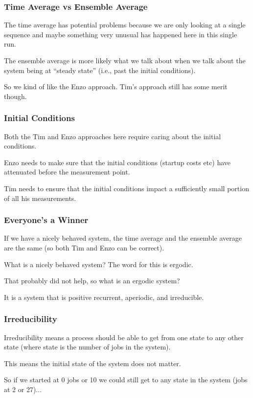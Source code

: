 \begin{frame}
\frametitle{Time Average vs Ensemble Average}

The time average has potential problems because we are only looking at a single sequence and maybe something very unusual has happened here in this single run. 

The ensemble average is more likely what we talk about when we talk about the system being at ``steady state'' (i.e., past the initial conditions). 

So we kind of like the Enzo approach. Tim's approach still has some merit though.

\end{frame}



\begin{frame}
\frametitle{Initial Conditions}

Both the Tim and Enzo approaches here require caring about the initial conditions. 

Enzo needs to make sure that the initial conditions (startup costs etc) have attenuated before the measurement point. 

Tim needs to ensure that the initial conditions impact a sufficiently small portion of all his measurements.

\end{frame}



\begin{frame}
\frametitle{Everyone's a Winner}

If we have a nicely behaved system, the time average and the ensemble average are the same (so both Tim and Enzo can be correct). 

What is a nicely behaved system? The word for this is \alert{ergodic}. 

That probably did not help, so what is an ergodic system? 

It is a system that is positive recurrent, aperiodic, and irreducible.

\end{frame}



\begin{frame}
\frametitle{Irreducibility}

\alert{Irreducibility} means a process should be able to get from one state to any other state (where state is the number of jobs in the system). 

This means the initial state of the system does not matter. 

So if we started at 0 jobs or 10 we could still get to any state in the system (jobs at 2 or 27)...

\end{frame}



